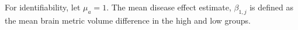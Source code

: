 For identifiability, let $\mu_{a} = 1$. The mean disease effect estimate, $\beta_{1,j}$ is defined as the mean brain metric volume difference in the high and low groups.